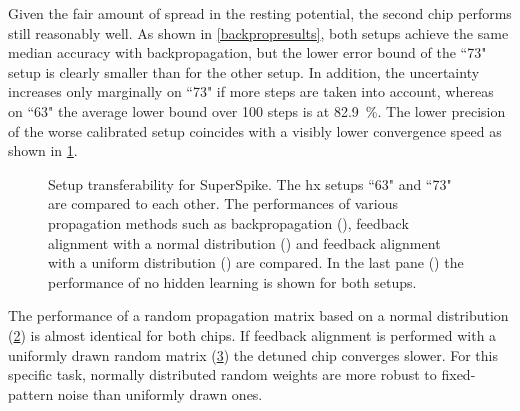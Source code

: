 Given the fair amount of spread in the resting potential, the second chip performs still reasonably well. As shown in \cref{backpropresults}, both setups achieve the same median accuracy with backpropagation, but the lower error bound of the ``73" setup is clearly smaller than for the other setup. In addition, the uncertainty increases only marginally on ``73" if more steps are taken into account, whereas on ``63" the average lower bound over 100 steps is at \SI{82.9}{\%}. The lower precision of the worse calibrated setup coincides with a visibly lower convergence speed as shown in \cref{hx63vs73bp}. 

\begin{figure}[htb!]
	\begin{subfigure}{0.245\textwidth}
		\caption{}
		\vspace{-0.3cm}
		\centering
		
		\label{hx63vs73bp}
	\end{subfigure}
	\begin{subfigure}{0.245\textwidth}
		\caption{}
		\vspace{-0.3cm}
		\centering
		
		\label{hx63vs73fanormal}
	\end{subfigure}
	\begin{subfigure}{0.245\textwidth}
		\caption{}
		\vspace{-0.3cm}
		\centering
		
		\label{hx63vs73fauniform}
	\end{subfigure}
	\begin{subfigure}{0.245\textwidth}
		\caption{}
		\vspace{-0.3cm}
		\centering
		
		\label{hx63vs73nohidden}
	\end{subfigure}
	\caption[Setup transferability for SuperSpike.]{Setup transferability for SuperSpike. The \gls{hx} setups ``63" and ``73" are compared to each other. The performances of various propagation methods such as backpropagation (), feedback alignment with a normal distribution () and feedback alignment with a uniform distribution () are compared. In the last pane () the performance of no hidden learning is shown for both setups.}
	\label{hxsetuptransferability}
\end{figure}

The performance of a random propagation matrix based on a normal distribution (\cref{hx63vs73fanormal}) is almost identical for both chips. If feedback alignment is performed with a uniformly drawn random matrix (\cref{hx63vs73fauniform}) the detuned chip converges slower. For this specific task, normally distributed random weights are more robust to fixed-pattern noise than uniformly drawn ones. 



